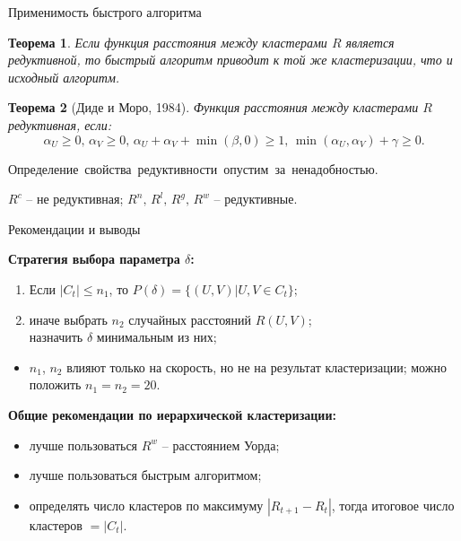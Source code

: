 \documentclass[unicode, notheorems, pdf]{beamer}
\newtheorem{theorem}{Теорема}
\begin{document}
\begin{frame}{Применимость быстрого алгоритма}
	\begin{theorem}
		Если функция расстояния между кластерами $R$ является редуктивной, то быстрый алгоритм приводит к той же кластеризации, что и исходный алгоритм.
	\end{theorem}

	\begin{theorem}[Диде и Моро, 1984]
		Функция расстояния между кластерами $R$ редуктивная, если:
		\[\alpha_U\ge0,\,\alpha_V\ge0,\,\alpha_U+\alpha_V+\min(\beta,0)\ge1,\,\min(\alpha_U,\alpha_V)+\gamma\ge0.\]
	\end{theorem}

	\vspace{0.25cm}
	\mbox{Определение свойства редуктивности опустим за ненадобностью.}

	\vspace{0.5cm}
	$R^c$ -- не редуктивная; $R^n,\,R^l,\,R^g,\,R^w$ -- редуктивные.
\end{frame}

\begin{frame}{Рекомендации и выводы}

	{\bf Стратегия выбора параметра $\delta$:}
	\begin{enumerate}
		\item Если $|C_t|\le n_1$, то $P(\delta)=\{(U,V)|U,V\in C_t\};$
		\item иначе выбрать $n_2$ случайных расстояний $R(U,V)$;\\
		назначить $\delta$ минимальным из них;
	\end{enumerate}
	\begin{itemize}
		\item $n_1$, $n_2$ влияют только на скорость, но не на результат кластеризации; можно положить $n_1=n_2=20$.
	\end{itemize}

	\pause
	{\bf Общие рекомендации по иерархической кластеризации:}
	\begin{itemize}
		\item лучше пользоваться $R^w$ -- расстоянием Уорда;
		\item лучше пользоваться быстрым алгоритмом;
		\item определять число кластеров по максимуму $|R_{t+1}-R_t|$, тогда итоговое число кластеров $=|C_t|$.
	\end{itemize}
\end{frame}
\end{document}
